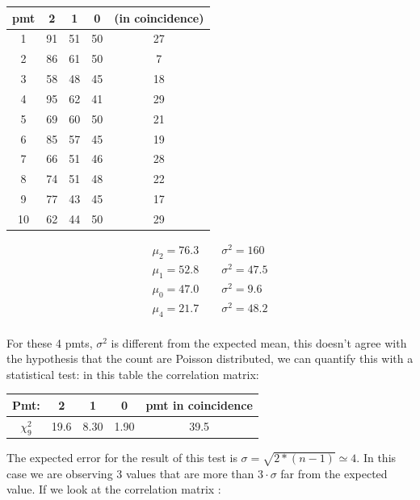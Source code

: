 \begin{center}
\begin{tabular}{|c|c|c|c|c|}
\hline 
pmt & 2 & 1 & 0 & (in coincidence) \\ 
\hline 
1 & 91 & 51 & 50 & 27 \\ 
\hline 
2 & 86 & 61 & 50 & 7 \\ 
\hline 
3 & 58 & 48 & 45 & 18 \\ 
\hline 
4 & 95 & 62 & 41 & 29 \\ 
\hline 
5 & 69 & 60 & 50 & 21 \\ 
\hline 
6 & 85 & 57 & 45 & 19 \\ 
\hline 
7 & 66 & 51 & 46 & 28 \\ 
\hline 
8 & 74 & 51 & 48 & 22 \\ 
\hline 
9 & 77 & 43 & 45 & 17 \\ 
\hline 
10 & 62 & 44 & 50 & 29 \\ 
\hline 
\end{tabular} 
\end{center}

\begin{equation*}
\begin{split}
\mu_{2} = 76.3 \qquad \sigma^{2} = 160  \\
\mu_{1} = 52.8 \qquad \sigma^{2} = 47.5 \\
\mu_{0} = 47.0 \qquad \sigma^{2} = 9.6  \\
\mu_{4} = 21.7 \qquad \sigma^{2} = 48.2 \\
\end{split}
\end{equation*}

For these 4 pmts, $\sigma^{2}$ is different from the expected mean, this doesn't agree with the hypothesis that the count are Poisson distributed, we can quantify this with a statistical test: in this table the correlation matrix:

\begingroup
\setlength{\tabcolsep}{8pt} %
\renewcommand{\arraystretch}{1.2} %
\begin{center}
\begin{tabular}{|c|c|c|c|c|}
\hline 
Pmt: & 2 & 1 & 0 & pmt in coincidence \\ 
\hline
$\chi^{2}_{9}$ & 19.6 & 8.30 & 1.90 & 39.5\\ 
\hline
\end{tabular} 
\end{center}
\endgroup
\smallskip

The expected error for the result of this test is $\sigma = \sqrt{2*(n-1)} \simeq 4$. In this case we are observing 3 values that are more than  $3 \cdot \sigma$ far from the expected value. If we look at the correlation matrix :

